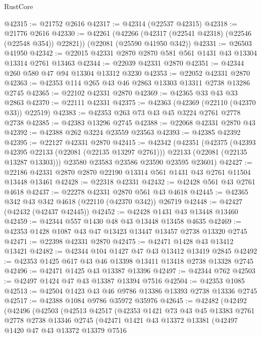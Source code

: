 \begin{lexlean}{RustCore}
\begin{coremodule}
@42315 := @21752 @2616
@42317 := @42314 (@22537 @42315)
@42318 := @21776 @2616
@42330 := @42261
    (@42266 (@42317 (@22541 @42318) (@22546 (@22548 @354)) @22821))
    (@22081 (@25590 @41950 @342))
@42331 := @26503 @41950
@42342 := @22015 @42331 @2870 @2870 @581 @561 @1431 @43 @13304 @13314 @2761 @13463
@42344 := @22039 @42331 @2870
@42351 := @42344 @260 @580 @47 @94 @13304 @13312 @3230
@42353 := @22052 @42331 @2870
@42363 := @42353 @114 @265 @43 @46 @2863 @13303 @13311 @2738 @13286 @2745
@42365 := @22102 @42331 @2870
@42369 := @42365 @33 @43 @33 @2863
@42370 := @22111 @42331
@42375 := @42363 (@42369 (@22110 (@42370 @33)) @22519)
@42383 := @42353 @263 @73 @43 @45 @3224 @2761 @2778 @2738
@42385 := @42383 @13296 @2745
@42388 := @22068 @42331 @2870 @43
@42392 := @42388 @262 @3224 @23559 @23563
@42393 := @42385 @42392
@42395 := @22127 @42331 @2870
@42415 := @42342
    (@42351
      (@42375
        (@42393 @42395 @22133 (@22081 (@22135 @13297 @2761)))
        @22133
        (@22081 (@22135 @13287 @13303)))
      @23580
      @23583
      @23586
      @23590
      @23595
      @23601)
@42427 := @22186 @42331 @2870 @2870 @22190 @13314 @561 @1431 @43 @2761 @11504 @13448 @13461
@42428 := @22318 @42331
@42432 := @42428 @561 @43 @2761 @4618
@42437 := @22278 @42331 @2870 @561 @43 @4618
@42445 := @42365 @342 @43 @342 @4618 (@22110 (@42370 @342)) @26719
@42448 := @42427 (@42432 (@42437 @42445))
@42452 := @42428 @1431 @43 @13448 @13460
@42459 := @42344 @557 @1430 @48 @43 @13448 @13458 @4635
@42469 := @42353 @1428 @1087 @43 @47 @13423 @13447 @13457 @2738 @13320 @2745
@42471 := @22398 @42331 @2870
@42475 := @42471 @1428 @43 @13412 @13421
@42482 := @42344 @104 @1427 @47 @43 @13412 @13419 @2845
@42492 := @42353 @1425 @617 @43 @46 @13398 @13411 @13418 @2738 @13328 @2745
@42496 := @42471 @1425 @43 @13387 @13396
@42497 := @42344 @762
@42503 := @42497 @1424 @47 @43 @13387 @13394 @7516
@42504 := @42353 @1085
@42513 := @42504 @1423 @43 @46 @9786 @13386 @13393 @2738 @13336 @2745
@42517 := @42388 @1084 @9786 @35972 @35976
@42645 := @42482
    (@42492
      (@42496
        (@42503
          (@42513
            @42517
            (@42353
              @1421
              @73
              @43
              @45
              @13383
              @2761
              @2778
              @2738
              @13346
              @2745
              (@42471
                @1421
                @43
                @13372
                @13381
                (@42497
                  @1420
                  @47
                  @43
                  @13372
                  @13379
                  @7516

\end{coremodule}
\end{lexlean}
